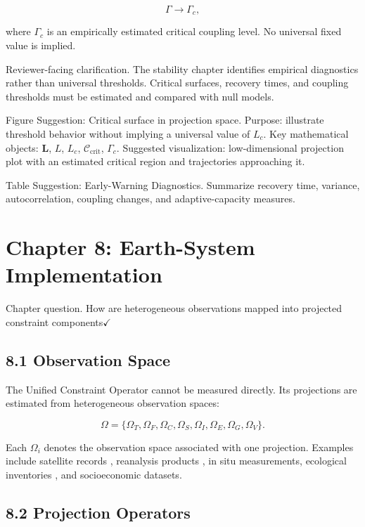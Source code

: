 \documentclass[aps,pre,reprint,superscriptaddress,nofootinbib]{revtex4-2}
\begin{document}
\[ \Gamma\rightarrow\Gamma_c, \]

where \(\Gamma_c\) is an empirically estimated critical coupling level. No universal fixed value is implied.

Reviewer-facing clarification. The stability chapter identifies empirical diagnostics rather than universal thresholds. Critical surfaces, recovery times, and coupling thresholds must be estimated and compared with null models.

Figure Suggestion: Critical surface in projection space. Purpose: illustrate threshold behavior without implying a universal value of \(L_c\). Key mathematical objects: \(\mathbf{L}\), \(L\), \(L_c\), \(\mathcal{C}_{\mathrm{crit}}\), \(\Gamma_c\). Suggested visualization: low-dimensional projection plot with an estimated critical region and trajectories approaching it.

Table Suggestion: Early-Warning Diagnostics. Summarize recovery time, variance, autocorrelation, coupling changes, and adaptive-capacity measures.

\section{Chapter 8: Earth-System Implementation}

Chapter question. How are heterogeneous observations mapped into projected constraint components$\checkmark$

\subsection{8.1 Observation Space}

The Unified Constraint Operator cannot be measured directly. Its projections are estimated from heterogeneous observation spaces:

\[ \Omega=\{\Omega_T,\Omega_F,\Omega_C,\Omega_S,\Omega_I,\Omega_E,\Omega_G,\Omega_V\}. \]

Each \(\Omega_i\) denotes the observation space associated with one projection. Examples include satellite records \cite{LoebCERES,JusticeMODIS,Tapley2004GRACE}, reanalysis products \cite{Hersbach2020ERA5}, in situ measurements, ecological inventories \cite{Folke2004Resilience}, and socioeconomic datasets.

\subsection{8.2 Projection Operators}
\end{document}

